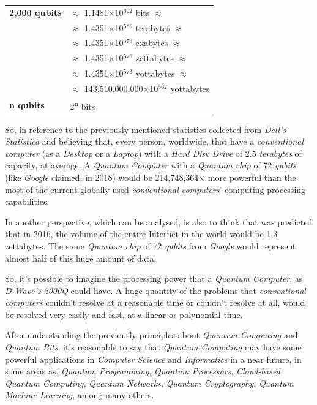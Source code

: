 \documentclass[conference]{IEEEtran}
\begin{document}
\begin{table}[!hp]
\begin{tabular}{ |p{1.8cm}|p{5.8cm}| }
     \hline
     \textbf{2,000 qubits} & $\approx$ 1.1481$\times$10$^{602}$ ‬bits $\approx$ \\ & $\approx$ 1.4351$\times$10$^{586}$ terabytes $\approx$ \\ & $\approx$ 1.4351$\times$10$^{579}$ exabytes $\approx$ \\ & $\approx$ 1.4351$\times$10$^{576}$ zettabytes $\approx$ \\ & $\approx$ 1.4351$\times$10$^{573}$ yottabytes $\approx$ \\ & $\approx$ 143,510,000,000$\times$10$^{562}$ yottabytes\\
     \hline
     \textbf{n qubits} & 2\textsuperscript{n} bits \\
     \hline
    \end{tabular}
\end{table}

\vspace{1pt}

So, in reference to the previously mentioned statistics collected from \textit{Dell's Statistica} and believing that, every person, worldwide, that have a \textit{conventional computer} (as a \textit{Desktop} or a \textit{Laptop}) with a \textit{Hard Disk Drive} of 2.5 \textit{terabytes} of capacity, at average. A \textit{Quantum Computer} with a \textit{Quantum chip} of 72 \textit{qubits} (like \textit{Google} claimed, in 2018) would be 214,748,364$\times$ more powerful than the most of the current globally used \textit{conventional computers}' computing processing capabilities.

\vspace{4pt}

In another perspective, which can be analysed, is also to think that was predicted that in 2016, the volume of the entire Internet in the world would be 1.3 zettabytes. The same \textit{Quantum chip} of 72 \textit{qubits} from \textit{Google} would represent almost half of this huge amount of data.

\vspace{4pt}

So, it's possible to imagine the processing power that a \textit{Quantum Computer}, as \textit{D-Wave's 2000Q} could have. A huge quantity of the problems that \textit{conventional computers} couldn't resolve at a reasonable time or couldn't resolve at all, would be resolved very easily and fast, at a linear or polynomial time.

\newpage

After understanding the previously principles about \textit{Quantum Computing} and \textit{Quantum Bits}, it's reasonable to say that \textit{Quantum Computing} may have some powerful applications in \textit{Computer Science} and \textit{Informatics} in a near future, in some areas as, \textit{Quantum Programming}, \textit{Quantum Processors}, \textit{Cloud-based Quantum Computing}, \textit{Quantum Networks}, \textit{Quantum Cryptography}, \textit{Quantum Machine Learning}, among many others.
\end{document}
